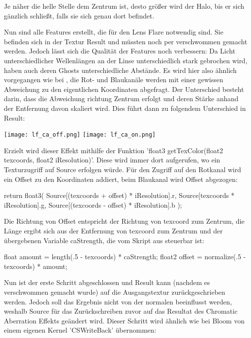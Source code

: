 Je näher die helle Stelle dem Zentrum ist, desto grö{\ss}er wird der Halo, bis er sich gänzlich schlie{\ss}t, falls sie sich genau dort befindet.

Nun sind alle Features erstellt, die für den Lens Flare notwendig sind. Sie befinden sich in der Textur Result und müssten noch per  verschwommen gemacht werden. Jedoch lässt sich die Qualität der Features noch verbessern: Da Licht unterschiedlicher Wellenlängen an der Linse unterschiedlich stark gebrochen wird, haben auch deren Ghosts unterschiedliche Abstände. Es wird hier also ähnlich vorgegangen wie bei , die Rot- und Blaukanäle werden mit einer gewissen Abweichung zu den eigentlichen Koordinaten abgefragt. Der Unterschied besteht darin, dass die Abweichung richtung Zentrum erfolgt und deren Stärke anhand der Entfernung davon skaliert wird. Dies führt dann zu folgendem Unterschied in Result:

\captionsetup{type=figure}
\texttt{[image: lf\_ca\_off.png]}
\texttt{[image: lf\_ca\_on.png]}

Erzielt wird dieser Effekt mithilfe der Funktion 'float3 getTexColor(float2 texcoords, float2 iResolution)'. Diese wird immer dort aufgerufen, wo ein Texturzugriff auf Source erfolgen würde. Für den Zugriff auf den Rotkanal wird ein Offset zu den Koordinaten addiert, beim Blaukanal wird Offset abgezogen:

\begin{hlsl}
return float3(
	Source[(texcoords + offset) * iResolution].r,
	Source[texcoords * iResolution].g,
	Source[(texcoords - offset) * iResolution].b
	);
\end{hlsl}

Die Richtung von Offset entspricht der Richtung von texcoord zum Zentrum, die Länge ergibt sich aus der Entfernung von texcoord zum Zentrum und der übergebenen Variable caStrength, die vom Skript aus steuerbar ist:

\begin{hlsl}
    float amount = length(.5 - texcoords) * caStrength;
    float2 offset = normalize(.5 - texcoords) * amount;
\end{hlsl}

Nun ist der erste Schritt abgeschlossen und Result kann (nachdem es verschwommen gemacht wurde) auf die Ausgangstextur zurückgeschrieben werden. Jedoch soll das Ergebnis nicht von der normalen  beeinflusst werden, weshalb Source für das Zurückschreiben zuvor auf das Resultat des Chromatic Aberration Effekts geändert wird. Dieser Schritt wird ähnlich wie bei Bloom von einem eigenen Kernel 'CSWriteBack' übernommen:

